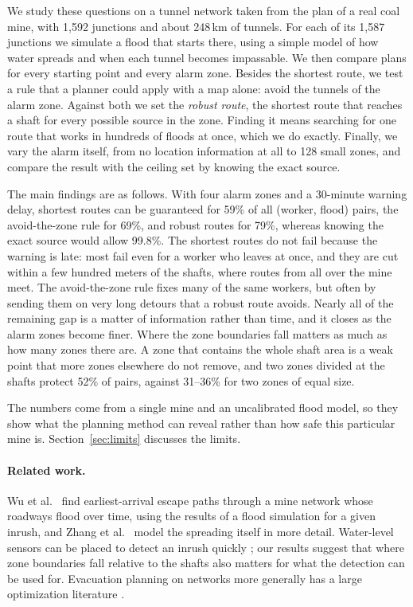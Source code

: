 \documentclass[11pt,a4paper]{article}
\begin{document}
We study these questions on a tunnel network taken from the plan of a real coal mine, with 1,592 junctions and about 248\,km of tunnels. For each of its 1,587 junctions we simulate a flood that starts there, using a simple model of how water spreads and when each tunnel becomes impassable. We then compare plans for every starting point and every alarm zone. Besides the shortest route, we test a rule that a planner could apply with a map alone: avoid the tunnels of the alarm zone. Against both we set the \emph{robust route}, the shortest route that reaches a shaft for every possible source in the zone. Finding it means searching for one route that works in hundreds of floods at once, which we do exactly. Finally, we vary the alarm itself, from no location information at all to 128 small zones, and compare the result with the ceiling set by knowing the exact source.

The main findings are as follows. With four alarm zones and a 30-minute warning delay, shortest routes can be guaranteed for 59\% of all (worker, flood) pairs, the avoid-the-zone rule for 69\%, and robust routes for 79\%, whereas knowing the exact source would allow 99.8\%. The shortest routes do not fail because the warning is late: most fail even for a worker who leaves at once, and they are cut within a few hundred meters of the shafts, where routes from all over the mine meet. The avoid-the-zone rule fixes many of the same workers, but often by sending them on very long detours that a robust route avoids. Nearly all of the remaining gap is a matter of information rather than time, and it closes as the alarm zones become finer. Where the zone boundaries fall matters as much as how many zones there are. A zone that contains the whole shaft area is a weak point that more zones elsewhere do not remove, and two zones divided at the shafts protect 52\% of pairs, against 31--36\% for two zones of equal size.

The numbers come from a single mine and an uncalibrated flood model, so they show what the planning method can reveal rather than how safe this particular mine is. Section~\ref{sec:limits} discusses the limits.

\paragraph{Related work.}
Wu et al.\ \cite{wu2020} find earliest-arrival escape paths through a mine network whose roadways flood over time, using the results of a flood simulation for a given inrush, and Zhang et al.\ \cite{zhang2022} model the spreading itself in more detail. Water-level sensors can be placed to detect an inrush quickly \cite{wu2021}; our results suggest that where zone boundaries fall relative to the shafts also matters for what the detection can be used for. Evacuation planning on networks more generally has a large optimization literature \cite{bayram2016}.
\end{document}
